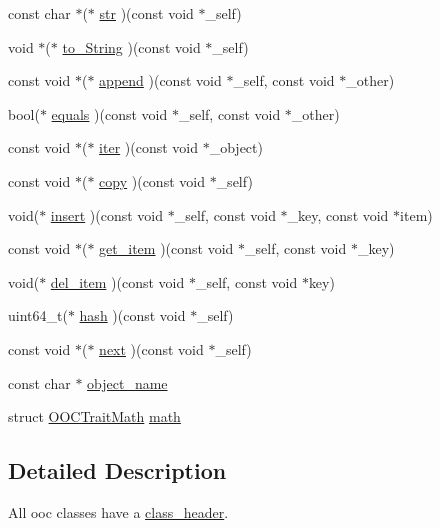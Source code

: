 \begin{DoxyCompactItemize}
const char $\ast$($\ast$ \mbox{\hyperlink{structclass__header_af8a0a6de1e1eb96faab68cc58fcf84d0}{str}} )(const void $\ast$\+\_\+self)
\item 
void $\ast$($\ast$ \mbox{\hyperlink{structclass__header_a67a4f888ffa78b4905bc3585fe1f17a4}{to\+\_\+\+String}} )(const void $\ast$\+\_\+self)
\item 
const void $\ast$($\ast$ \mbox{\hyperlink{structclass__header_a10e4c230bf810df38e3581caabad02bb}{append}} )(const void $\ast$\+\_\+self, const void $\ast$\+\_\+other)
\item 
bool($\ast$ \mbox{\hyperlink{structclass__header_a01dc6aae9011475ec7be8500d4f63c5b}{equals}} )(const void $\ast$\+\_\+self, const void $\ast$\+\_\+other)
\item 
const void $\ast$($\ast$ \mbox{\hyperlink{structclass__header_ab45bdc16b08b8cde751d161dd0c4f230}{iter}} )(const void $\ast$\+\_\+object)
\item 
const void $\ast$($\ast$ \mbox{\hyperlink{structclass__header_a26ec3e94c98bf5d3eff10d37cf2696ef}{copy}} )(const void $\ast$\+\_\+self)
\item 
void($\ast$ \mbox{\hyperlink{structclass__header_ada4fc11b4f09e8248a28c7d2e39e17ea}{insert}} )(const void $\ast$\+\_\+self, const void $\ast$\+\_\+key, const void $\ast$item)
\item 
const void $\ast$($\ast$ \mbox{\hyperlink{structclass__header_ae59ea98ace6dc13ad2182a1433f78110}{get\+\_\+item}} )(const void $\ast$\+\_\+self, const void $\ast$\+\_\+key)
\item 
void($\ast$ \mbox{\hyperlink{structclass__header_a4d88d979ecf23c184577d937454ab973}{del\+\_\+item}} )(const void $\ast$\+\_\+self, const void $\ast$key)
\item 
uint64\+\_\+t($\ast$ \mbox{\hyperlink{structclass__header_aa0035a2c833b1e46f0ae401d6b44ee65}{hash}} )(const void $\ast$\+\_\+self)
\item 
const void $\ast$($\ast$ \mbox{\hyperlink{structclass__header_a34b23ea4b047e4526bfb743d5be3e69c}{next}} )(const void $\ast$\+\_\+self)
\item 
const char $\ast$ \mbox{\hyperlink{structclass__header_af7f2f5623c98afb59519062172644350}{object\+\_\+name}}
\item 
struct \mbox{\hyperlink{structOOCTraitMath}{O\+O\+C\+Trait\+Math}} \mbox{\hyperlink{structclass__header_a119175910ca4b52e4671f04616dcd2f6}{math}}
\end{DoxyCompactItemize}


\subsection{Detailed Description}
All ooc classes have a \mbox{\hyperlink{structclass__header}{class\+\_\+header}}.

